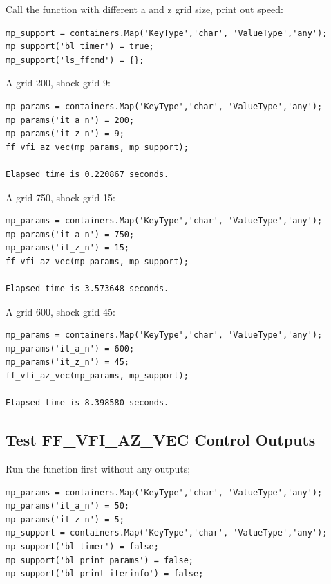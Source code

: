\documentclass[
]{book}
\begin{document}
Call the function with different a and z grid size, print out speed:

\begin{verbatim}
mp_support = containers.Map('KeyType','char', 'ValueType','any');
mp_support('bl_timer') = true;
mp_support('ls_ffcmd') = {};
\end{verbatim}

A grid 200, shock grid 9:

\begin{verbatim}
mp_params = containers.Map('KeyType','char', 'ValueType','any');
mp_params('it_a_n') = 200;
mp_params('it_z_n') = 9;
ff_vfi_az_vec(mp_params, mp_support);

Elapsed time is 0.220867 seconds.
\end{verbatim}

A grid 750, shock grid 15:

\begin{verbatim}
mp_params = containers.Map('KeyType','char', 'ValueType','any');
mp_params('it_a_n') = 750;
mp_params('it_z_n') = 15;
ff_vfi_az_vec(mp_params, mp_support);

Elapsed time is 3.573648 seconds.
\end{verbatim}

A grid 600, shock grid 45:

\begin{verbatim}
mp_params = containers.Map('KeyType','char', 'ValueType','any');
mp_params('it_a_n') = 600;
mp_params('it_z_n') = 45;
ff_vfi_az_vec(mp_params, mp_support);

Elapsed time is 8.398580 seconds.
\end{verbatim}

\hypertarget{test-ff_vfi_az_vec-control-outputs}{%
\subsection{Test FF\_VFI\_AZ\_VEC Control Outputs}\label{test-ff_vfi_az_vec-control-outputs}}

Run the function first without any outputs;

\begin{verbatim}
mp_params = containers.Map('KeyType','char', 'ValueType','any');
mp_params('it_a_n') = 50;
mp_params('it_z_n') = 5;
mp_support = containers.Map('KeyType','char', 'ValueType','any');
mp_support('bl_timer') = false;
mp_support('bl_print_params') = false;
mp_support('bl_print_iterinfo') = false;
\end{verbatim}
\end{document}

